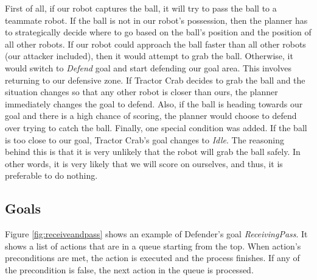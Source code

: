First of all, if our robot captures the ball, it will try to pass the ball to a
teammate robot. If the ball is not in our robot's possession, then the planner
has to strategically decide where to go based on the ball's position and the
position of all other robots. If our robot could approach the ball faster than
all other robots (our attacker included), then it would attempt to grab the
ball. Otherwise, it would switch to \emph{Defend} goal and start defending our
goal area. This involves returning to our defensive zone. If Tractor Crab
decides to grab the ball and the situation changes so that any other robot is
closer than ours, the planner immediately changes the goal to defend. Also, if
the ball is heading towards our goal and there is a high chance of scoring, the
planner would choose to defend over trying to catch the ball. Finally, one
special condition was added. If the ball is too close to our goal, Tractor
Crab's goal changes to \emph{Idle}. The reasoning behind this is that it is
very unlikely that the robot will grab the ball safely. In other words, it is
very likely that we will score on ourselves, and thus, it is preferable to do
nothing.

\subsection{Goals}

Figure \ref{fig:receiveandpass} shows an example of Defender's goal
\emph{ReceivingPass}. It shows a list of actions that are in a queue starting
from the top. When action's preconditions are met, the action is executed and
the process finishes. If any of the precondition is false, the next action in
the queue is processed.

